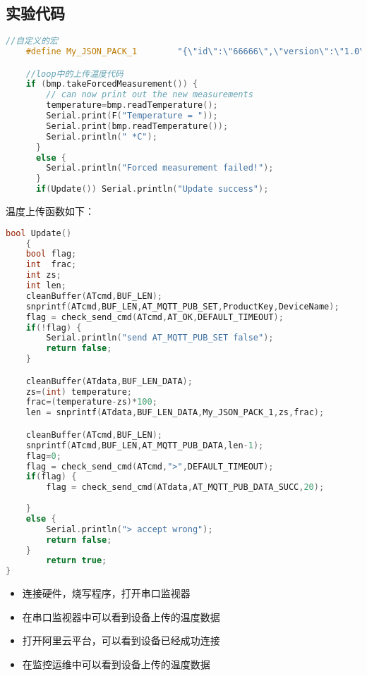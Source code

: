 \documentclass[12pt,hyperref,a4paper,UTF8]{ctexart}
\begin{document}
\subsection*{实验代码}
    
\begin{lstlisting}[language=C++]
    //自定义的宏
    #define My_JSON_PACK_1        "{\"id\":\"66666\",\"version\":\"1.0\",\"method\":\"thing.event.property.post\",\"params\":{\"Temperature\":%d.%02d}}\r"

    //loop中的上传温度代码
    if (bmp.takeForcedMeasurement()) {
        // can now print out the new measurements
        temperature=bmp.readTemperature();
        Serial.print(F("Temperature = "));
        Serial.print(bmp.readTemperature());
        Serial.println(" *C");
      } 
      else {
        Serial.println("Forced measurement failed!");
      }
      if(Update()) Serial.println("Update success");
\end{lstlisting}

温度上传函数如下：
    \begin{lstlisting}[language=C++]
bool Update()
    {
    bool flag;
    int  frac;
    int zs;
    int len;
    cleanBuffer(ATcmd,BUF_LEN);
    snprintf(ATcmd,BUF_LEN,AT_MQTT_PUB_SET,ProductKey,DeviceName);
    flag = check_send_cmd(ATcmd,AT_OK,DEFAULT_TIMEOUT);
    if(!flag) {
        Serial.println("send AT_MQTT_PUB_SET false");
        return false;
    }

    cleanBuffer(ATdata,BUF_LEN_DATA);
    zs=(int) temperature;
    frac=(temperature-zs)*100;
    len = snprintf(ATdata,BUF_LEN_DATA,My_JSON_PACK_1,zs,frac);

    cleanBuffer(ATcmd,BUF_LEN);
    snprintf(ATcmd,BUF_LEN,AT_MQTT_PUB_DATA,len-1);
    flag=0;
    flag = check_send_cmd(ATcmd,">",DEFAULT_TIMEOUT);
    if(flag) {
        flag = check_send_cmd(ATdata,AT_MQTT_PUB_DATA_SUCC,20);
        
    } 
    else {
        Serial.println("> accept wrong");
        return false;
    }
        return true;
}
    \end{lstlisting}



\begin{itemize}[itemsep=-5pt, topsep=0pt, partopsep=0pt]
    \item 连接硬件，烧写程序，打开串口监视器
    \item 在串口监视器中可以看到设备上传的温度数据
    \item 打开阿里云平台，可以看到设备已经成功连接
    \item 在监控运维中可以看到设备上传的温度数据
\end{itemize}
\end{document}
